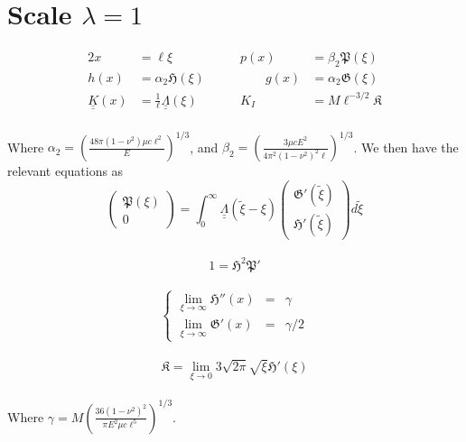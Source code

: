 \documentclass{article}
\newcommand{\fP}{\mathfrak{P}}                               %
\newcommand{\fH}{\mathfrak{H}}                               %
\newcommand{\fG}{\mathfrak{G}}                               %
\newcommand{\fK}{\mathfrak{K}}                               %
\begin{document}
\section{Scale $\lambda=1$}
%
\begin{alignat*}{2}
x &= \ell \xi  & p(x) &= \beta_2 \fP (\xi) \\
h(x) &= \alpha_2 \fH(\xi) \qquad & \qquad g(x) &= \alpha_2 \fG (\xi) \\
\underline{\underline{K}}(x) &= \frac{1}{\ell} 
\underline{\underline{\Lambda}}(\xi) & 
K_I &= M \ell^{-3/2} \fK 
\end{alignat*}
%
\\
Where $\displaystyle \alpha_2 = \left(\frac{48\pi(1-\nu^2) \mu c \ell^2}{E}
\right)^{1/3}$, and $\displaystyle \beta_2 = \left(\frac{3\mu c E^2}{4\pi^2 
(1 - \nu^2)^2 \ell}\right)^{1/3}$.
We then have the relevant equations as 
\\
\begin{equation}
 \left( \begin{array}{c} \fP(\xi) \\ 0 \end{array} \right) =
\int_0^{\infty} 
\underline{\underline{\Lambda}}(\tilde{\xi}- \xi) 
\left( \begin{array}{c} \fG'(\tilde{\xi}) \\[4pt] \fH'(\tilde{\xi}) \end{array} 
\right) d\tilde{\xi}
\end{equation}
\\
\begin{equation}
1 = \fH^2 \fP'
\end{equation}
\\
\begin{equation}
\left\{ \begin{array}{ccc}
\displaystyle \lim_{\xi\to\infty} \fH''(x) & = & \gamma \\
\displaystyle \lim_{\xi\to\infty} \fG'(x) & = & \gamma/2  
\end{array} \right.
\end{equation}
\\
\begin{equation}
\fK = \lim_{\xi\to 0} 3 \sqrt{2\pi} \sqrt{\xi} \fH'(\xi)
\end{equation}
\\
Where $\gamma = M \left( \frac{36(1-\nu^2)^2}{\pi E^2 \mu c \ell^5} 
\right)^{1/3}$. 
\end{document}
